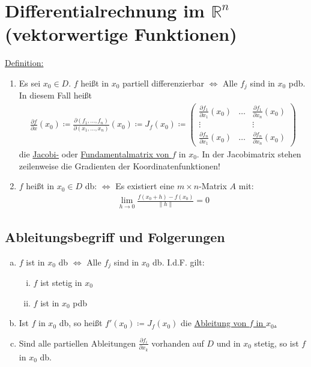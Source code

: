\section{Differentialrechnung im $\mathbb{R}^n$ (vektorwertige Funktionen)}
\underline{Definition:}
\begin{enumerate}
    \item Es sei $x_0 \in D$. $f$ heißt in $x_0$ partiell differenzierbar $\Leftrightarrow$ Alle $f_j$ sind in $x_0$ pdb. In diesem Fall heißt
    \begin{align*}
        \frac{\partial f}{\partial x}(x_0) \coloneqq \frac{\partial (f_1, \ldots, f_n)}{\partial (x_1, \ldots, x_n)} (x_0) \coloneqq J_f(x_0) \coloneqq
        \begin{pmatrix} \frac{\partial f_1}{\partial x_1}(x_0) & \ldots & \frac{\partial f_1}{\partial x_n}(x_0) \\ \vdots & & \vdots \\ 
        \frac{\partial f_n}{\partial x_1}(x_0) & \ldots & \frac{\partial f_n}{\partial x_n}(x_0)\end{pmatrix}
    \end{align*}
    die \underline{Jacobi-} oder \underline{Fundamentalmatrix von $f$} in $x_0$. In der Jacobimatrix stehen zeilenweise die Gradienten der Koordinatenfunktionen!
    \item $f$ heißt in $x_0 \in D$ db: $\Leftrightarrow$ Es existiert eine $m \times n$-Matrix $A$ mit: 
    \begin{align*}
        \lim \limits_{h \to 0} \frac{f(x_0 + h) - f(x_0)}{\lVert h \rVert} = 0
    \end{align*}
\end{enumerate}

\subsection{Ableitungsbegriff und Folgerungen}
\begin{enumerate} [a)]
    \item $f$ ist in $x_0$ db $\Leftrightarrow$ Alle $f_j$ sind in $x_0$ db. I.d.F. gilt:
    \begin{enumerate} [i)]
        \item $f$ ist stetig in $x_0$
        \item $f$ ist in $x_0$ pdb
    \end{enumerate}
    \item Ist $f$ in $x_0$ db, so heißt $f'(x_0) \coloneqq J_f(x_0)$ die \underline{Ableitung von $f$ in $x_0$.}
    \item Sind alle partiellen Ableitungen $\frac{\partial f_i}{\partial x_k}$ vorhanden auf $D$ und in $x_0$ stetig, so ist $f$ in $x_0$ db.
\end{enumerate}

